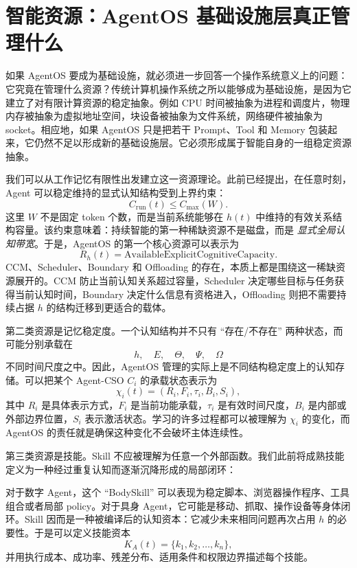 \section{智能资源：AgentOS 基础设施层真正管理什么}

如果 AgentOS 要成为基础设施，就必须进一步回答一个操作系统意义上的问题：它究竟在管理什么资源？传统计算机操作系统之所以能够成为基础设施，是因为它建立了对有限计算资源的稳定抽象。例如 CPU 时间被抽象为进程和调度片，物理内存被抽象为虚拟地址空间，块设备被抽象为文件系统，网络硬件被抽象为 socket。相应地，如果 AgentOS 只是把若干 Prompt、Tool 和 Memory 包装起来，它仍然不足以形成新的基础设施层。它必须形成属于智能自身的一组稳定资源抽象。

我们可以从工作记忆有限性出发建立这一资源理论。此前已经提出，在任意时刻，Agent 可以稳定维持的显式认知结构受到上界约束：
\[
C_{\mathrm{run}}(t)\leq C_{\max}(W).
\]
这里 $W$ 不是固定 token 个数，而是当前系统能够在 $h(t)$ 中维持的有效关系结构容量。该约束意味着：持续智能的第一种稀缺资源不是磁盘，而是 \emph{显式全局认知带宽}。于是，AgentOS 的第一个核心资源可以表示为
\[
R_h(t)=\text{AvailableExplicitCognitiveCapacity}.
\]
CCM、Scheduler、Boundary 和 Offloading 的存在，本质上都是围绕这一稀缺资源展开的。CCM 防止当前认知关系超过容量，Scheduler 决定哪些目标与任务获得当前认知时间，Boundary 决定什么信息有资格进入，Offloading 则把不需要持续占据 $h$ 的结构迁移到更适合的载体。

第二类资源是记忆稳定度。一个认知结构并不只有 ``存在/不存在'' 两种状态，而可能分别承载在
\[
h,\quad E,\quad \Theta,\quad \Psi,\quad \Omega
\]
不同时间尺度之中。因此，AgentOS 管理的实际上是不同结构稳定度上的认知存储。可以把某个 Agent-CSO $C_i$ 的承载状态表示为
\[
\chi_i(t)
=
(R_i,F_i,\tau_i,B_i,S_i),
\]
其中 $R_i$ 是具体表示方式，$F_i$ 是当前功能承载，$\tau_i$ 是有效时间尺度，$B_i$ 是内部或外部边界位置，$S_i$ 表示激活状态。学习的许多过程都可以被理解为 $\chi_i$ 的变化，而 AgentOS 的责任就是确保这种变化不会破坏主体连续性。

第三类资源是技能。Skill 不应被理解为任意一个外部函数。我们此前将成熟技能定义为一种经过重复认知而逐渐沉降形成的局部闭环：
\begin{statementbox}
\centering
{}
\end{statementbox}
对于数字 Agent，这个 ``BodySkill'' 可以表现为稳定脚本、浏览器操作程序、工具组合或者局部 policy。对于具身 Agent，它可能是移动、抓取、操作设备等身体闭环。Skill 因而是一种被编译后的认知资本：它减少未来相同问题再次占用 $h$ 的必要性。于是可以定义技能资本
\[
K_A(t)=\{k_1,k_2,\ldots,k_n\},
\]
并用执行成本、成功率、残差分布、适用条件和权限边界描述每个技能。

